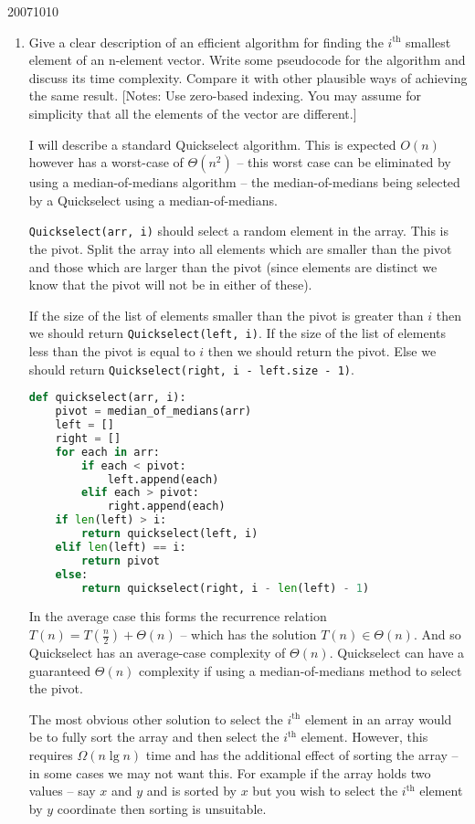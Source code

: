 \documentclass[10pt,\jkfside,a4paper]{article}
\begin{document}
\begin{examquestion}{2007}{10}{10}

\begin{enumerate}

\item Give a clear description of an efficient algorithm for finding the $i^\text{th}$ smallest
element of an n-element vector. Write some pseudocode for the algorithm
and discuss its time complexity. Compare it with other plausible ways of
achieving the same result. [Notes: Use zero-based indexing. You may assume
for simplicity that all the elements of the vector are different.]

I will describe a standard Quickselect algorithm. This is expected $O(n)$ however 
has a worst-case of $\Theta(n^2)$ -- this worst case can be eliminated by using a median-of-medians 
algorithm -- the median-of-medians being selected by a Quickselect using a median-of-medians.

{\tt Quickselect(arr, i)} should select a random element in the array. This is the pivot. Split the 
array into all elements which are smaller than the pivot and those which are larger than the 
pivot (since elements are distinct we know that the pivot will not be in either of these).

If the size of the list of elements smaller than the pivot is greater than $i$ then we 
should return {\tt Quickselect(left, i)}. If the size of the list of elements less than the pivot 
is equal to $i$ then we should return the pivot. Else we should return 
{\tt Quickselect(right, i - left.size - 1)}.

\begin{lstlisting}[language=python]
def quickselect(arr, i):
	pivot = median_of_medians(arr)
	left = []
	right = []
	for each in arr:
		if each < pivot:
			left.append(each)
		elif each > pivot:
			right.append(each)
	if len(left) > i:
		return quickselect(left, i)
	elif len(left) == i:
		return pivot
	else:
		return quickselect(right, i - len(left) - 1)
\end{lstlisting}

In the average case this forms the recurrence relation $T(n) = T\left(\frac{n}{2}\right) + \Theta(n)$ -- 
which has the solution $T(n) \in \Theta(n)$. And so Quickselect has an average-case complexity of 
$\Theta(n)$. Quickselect can have a guaranteed $\Theta(n)$ complexity if using a median-of-medians 
method to select the pivot.

The most obvious other solution to select the $i^{\text{th}}$ element in an array would be 
to fully sort the array and then select the $i^{\text{th}}$ element. However, this requires $\Omega(n\lg n)$ 
time and has the additional effect of sorting the array -- in some cases we may not want this. For example 
if the array holds two values -- say $x$ and $y$ and is sorted by $x$ but you wish to select the $i^{\text{th}}$ 
element by $y$ coordinate then sorting is unsuitable.


\end{enumerate}
\end{examquestion}
\end{document}
